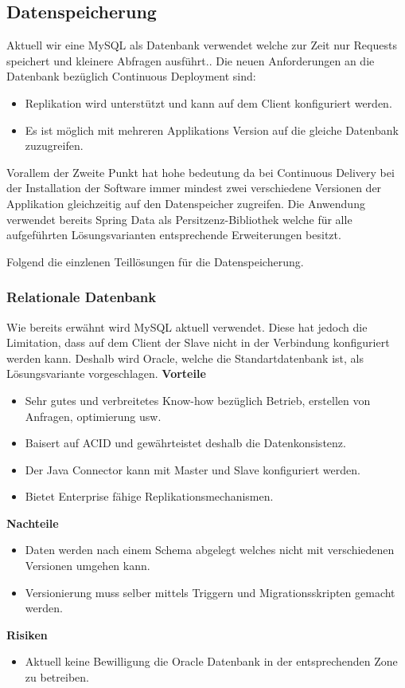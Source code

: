 \subsection{Datenspeicherung}

Aktuell wir eine MySQL als Datenbank verwendet welche zur Zeit nur Requests speichert und kleinere Abfragen ausführt.. Die neuen Anforderungen an die Datenbank bezüglich Continuous Deployment sind:
\begin{itemize}
	\item Replikation wird unterstützt und kann auf dem Client konfiguriert werden.
	\item Es ist möglich mit mehreren Applikations Version auf die gleiche Datenbank zuzugreifen.
\end{itemize}
Vorallem der Zweite Punkt hat hohe bedeutung da bei Continuous Delivery bei der Installation der Software immer mindest zwei verschiedene Versionen der Applikation gleichzeitig auf den Datenspeicher zugreifen. Die Anwendung verwendet bereits Spring Data als Persitzenz-Bibliothek welche für alle aufgeführten Lösungsvarianten entsprechende Erweiterungen besitzt.

Folgend die einzlenen Teillösungen für die Datenspeicherung.

\subsubsection{Relationale Datenbank}

Wie bereits erwähnt wird MySQL aktuell verwendet. Diese hat jedoch die Limitation, dass auf dem Client der Slave nicht in der Verbindung konfiguriert werden kann. Deshalb wird Oracle, welche die Standartdatenbank ist, als Lösungsvariante vorgeschlagen.
\newline
\newline
\textbf{Vorteile}
\begin{itemize}
	\item Sehr gutes und verbreitetes Know-how bezüglich Betrieb, erstellen von Anfragen, optimierung usw.
	\item Baisert auf ACID und gewährteistet deshalb die Datenkonsistenz.
	\item Der Java Connector kann mit Master und Slave konfiguriert werden.
	\item Bietet Enterprise fähige Replikationsmechanismen.
\end{itemize}
\textbf{Nachteile}
\begin{itemize}
	\item Daten werden nach einem Schema abgelegt welches nicht mit verschiedenen Versionen umgehen kann.
	\item Versionierung muss selber mittels Triggern und Migrationsskripten gemacht werden.	
\end{itemize}
\textbf{Risiken}
\begin{itemize}
	\item Aktuell keine Bewilligung die Oracle Datenbank in der entsprechenden Zone zu betreiben.
\end{itemize}

